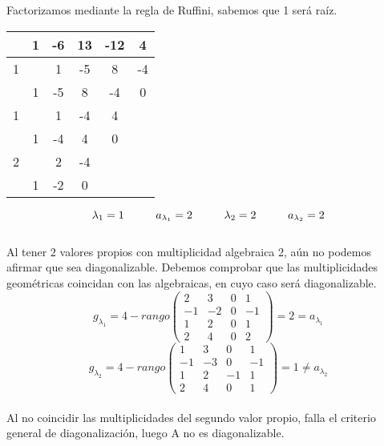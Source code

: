 \documentclass[a4paper,10pt]{article}
\begin{document}
Factorizamos mediante la regla de Ruffini, sabemos que 1 será raíz.
\\
\begin{center}
\begin{tabular}{|c|c|c|c|c|c|}
\hline 
 & 1 & -6 & 13 & -12 & 4 \\
\hline 
1 &  & 1 & -5 & 8 & -4 \\ 
\hline 
 & 1 & -5 & 8 & -4 & 0 \\ 
\hline 
1 &  & 1 & -4 & 4 &  \\ 
\hline 
 & 1 & -4 & 4 & 0 &  \\ 
\hline 
2 &  & 2 & -4 &  &  \\ 
\hline 
 & 1 & -2 & 0 &  &  \\ 
\hline 
\end{tabular}
$$
\lambda_1=1 \hspace*{1cm} a_{\lambda_1}=2 \hspace*{1cm} \lambda_2=2 \hspace*{1cm} a_{\lambda_2}=2
$$
\\
Al tener 2 valores propios con multiplicidad algebraica 2, aún no podemos afirmar que sea diagonalizable. Debemos comprobar que las multiplicidades geométricas coincidan con las algebraicas, en cuyo caso será diagonalizable.
\\
$$
g_{\lambda_1}=4-rango\begin{pmatrix}
2 & 3 & 0 & 1 \\ 
-1 & -2 & 0 & -1 \\ 
1 & 2 & 0 & 1 \\ 
2 & 4 & 0 & 2
\end{pmatrix}=2=a_{\lambda_1}
$$
$$
g_{\lambda_2}=4-rango\begin{pmatrix}
1 & 3 & 0 & 1 \\ 
-1 & -3 & 0 & -1 \\ 
1 & 2 & -1 & 1 \\ 
2 & 4 & 0 & 1
\end{pmatrix}=1\neq a_{\lambda_2} 
$$
\\

Al no coincidir las multiplicidades del segundo valor propio, falla el criterio general de diagonalización, luego A no es diagonalizable.
\end{center}
\end{document}

